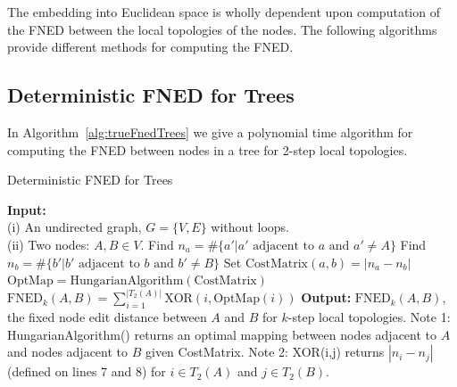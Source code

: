 \documentclass{article}
\begin{document}
The embedding into Euclidean space is wholly dependent upon computation of the FNED between the local topologies of the nodes. The following algorithms provide different methods for computing the FNED.


\subsection{Deterministic FNED for Trees}

In Algorithm~\ref{alg:trueFnedTrees} we give a polynomial time algorithm for computing the FNED between nodes in a tree for 2-step local topologies.
\begin{algorithm}[!]
\caption{Deterministic FNED for Trees}
\label{alg:trueFnedTrees}
\begin{algorithmic}[1]
\STATE \textbf{Input:} \\(i) An undirected graph, $G = \{V,E\}$ without loops.\\(ii) Two nodes: $A, B \in V$.
\STATE Find $n_{a} = \# \{ a' | a' \text{ adjacent to } a \text{ and } a' \neq A \}$
\STATE Find $n_{b} = \# \{ b' | b' \text{ adjacent to } b \text{ and } b' \neq B \}$
\STATE Set $\text{CostMatrix}(a,b) = | n_{a} - n_{b} |$
\ENDFOR
\ENDFOR
\STATE $\text{OptMap}=\text{HungarianAlgorithm}(\text{CostMatrix})$
\STATE $\text{FNED}_{k}(A,B) = \sum_{i=1}^{|T_{2}(A)|} \text{XOR}(i,\text{OptMap}(i))$
\STATE \textbf{Output:} $\text{FNED}_{k}(A,B)$, the fixed node edit distance between $A$ and $B$ for $k$-step local topologies.
\STATE Note 1: HungarianAlgorithm() returns an optimal mapping between nodes adjacent to $A$ and nodes adjacent to $B$ given CostMatrix.
\STATE Note 2: XOR(i,j) returns $|n_{i} - n_{j}|$ (defined on lines 7 and 8) for $i \in T_{2}(A)$ and $j \in T_{2}(B)$.
\end{algorithmic}
\end{algorithm}
\end{document}
